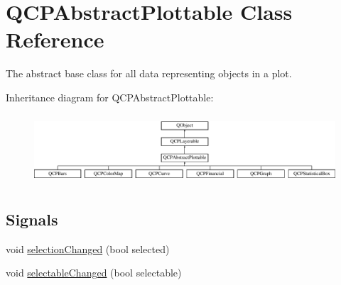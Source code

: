 \hypertarget{class_q_c_p_abstract_plottable}{}\section{Q\+C\+P\+Abstract\+Plottable Class Reference}
\label{class_q_c_p_abstract_plottable}


The abstract base class for all data representing objects in a plot.  


Inheritance diagram for Q\+C\+P\+Abstract\+Plottable\+:\begin{figure}[H]
\begin{center}
\leavevmode
\includegraphics[height=2.629108cm]{class_q_c_p_abstract_plottable}
\end{center}
\end{figure}
\subsection*{Signals}
\begin{DoxyCompactItemize}
\item 
void \hyperlink{class_q_c_p_abstract_plottable_a3af66432b1dca93b28e00e78a8c7c1d9}{selection\+Changed} (bool selected)
\item 
void \hyperlink{class_q_c_p_abstract_plottable_a0059caa3f3581f3959660fef8cbb71c4}{selectable\+Changed} (bool selectable)
\end{DoxyCompactItemize}

